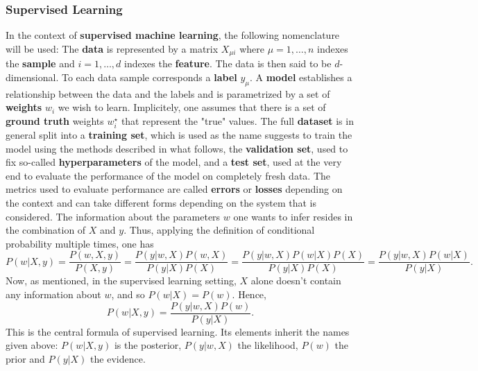 \documentclass{article}
\begin{document}
\subsubsection*{Supervised Learning}
\noindent In the context of \textbf{supervised machine learning}, the following nomenclature will be used:
The \textbf{data} is represented by a matrix $X_{\mu i}$ where $\mu = 1,\dots,n$ indexes the \textbf{sample} and $i = 1,\dots,d$ indexes the \textbf{feature}. The data is then said to be $d$-dimensional. To each data sample corresponds a \textbf{label} $y_{\mu}$. A \textbf{model} establishes a relationship between the data and the labels and is parametrized by a set of \textbf{weights} $w_i$ we wish to learn. Implicitely, one assumes that there is a set of \textbf{ground truth} weights $w_i^{\star}$ that represent the "true" values. The full \textbf{dataset} is in general split into a \textbf{training set}, which is used as the name suggests to train the model using the methods described in what follows, the \textbf{validation set}, used to fix so-called \textbf{hyperparameters} of the model, and a \textbf{test set}, used at the very end to evaluate the performance of the model on completely fresh data. The metrics used to evaluate performance are called \textbf{errors} or \textbf{losses} depending on the context and can take different forms depending on the system that is considered. The information about the parameters $w$ one wants to infer resides in the combination of $X$ and $y$. Thus, applying the definition of conditional probability multiple times, one has
\begin{equation}
    P(w | X,y) = \frac{P(w,X,y)}{P(X,y)}
    =
    \frac{P(y|w,X)P(w,X)}{P(y|X)P(X)}
    =
    \frac{P(y|w,X)P(w|X)P(X)}{P(y|X)P(X)}
    =
    \frac{P(y|w,X)P(w|X)}{P(y|X)}.
\end{equation}
Now, as mentioned, in the supervised learning setting, $X$ alone doesn't contain any information about $w$, and so $P(w|X) = P(w)$. Hence,
\begin{equation}
    P(w | X,y)
    =
    \frac{P(y|w,X)P(w)}{P(y|X)}.
    \label{eq:posterior}
\end{equation}
This is the central formula of supervised learning. Its elements inherit the names given above: $P(w | X,y)$ is the posterior, $P(y|w,X)$ the likelihood, $P(w)$ the prior and $P(y|X)$ the evidence. 
\end{document}
